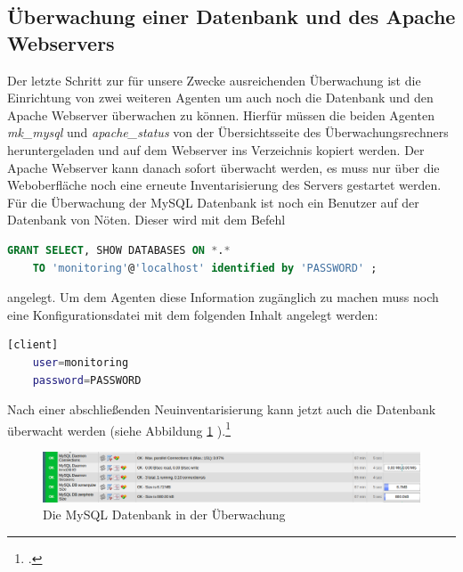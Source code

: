 \documentclass[12pt,a4paper,parskip,listof=totoc,bibliography=totoc]{scrreprt}
\begin{document}
	\subsection{Überwachung einer Datenbank und des Apache Webservers}
	Der letzte Schritt zur für unsere Zwecke ausreichenden Überwachung ist die Einrichtung von zwei weiteren Agenten um auch noch die Datenbank und den Apache Webserver überwachen zu können. Hierfür müssen die beiden Agenten \textit{mk\_mysql} und \textit{apache\_status} von der Übersichtsseite des Überwachungsrechners heruntergeladen und auf dem Webserver ins Verzeichnis  kopiert werden. Der Apache Webserver kann danach sofort überwacht werden, es muss nur über die Weboberfläche noch eine erneute Inventarisierung des Servers gestartet werden. Für die Überwachung der MySQL Datenbank ist noch ein Benutzer auf der Datenbank von Nöten. Dieser wird mit dem Befehl
	\begin{lstlisting}[language=sql, caption=Benutzer fürs Monitoring auf der Datenbank anlegen, label=lst:sqluser]
	GRANT SELECT, SHOW DATABASES ON *.*
	TO 'monitoring'@'localhost' identified by 'PASSWORD' ;\end{lstlisting}
	angelegt. Um dem Agenten diese Information zugänglich zu machen muss noch eine Konfigurationsdatei  mit dem folgenden Inhalt angelegt werden:
	\begin{lstlisting}[language=bash, caption=/etc/check\_mk/mysql.cfg, label=lst:configmkmysql]
	[client]
	user=monitoring
	password=PASSWORD\end{lstlisting}
	Nach einer abschließenden Neuinventarisierung kann jetzt auch die Datenbank überwacht werden (siehe Abbildung \ref{fig:mysqlueberw} ).\footcite{checkmkmysql}
	\begin{figure}[h!]
	\centering
	\includegraphics[width=1\linewidth]{pics/mysqlueberw}
	\caption[Die MySQL Datenbank in der Überwachung]{Die MySQL Datenbank in der Überwachung}
	\label{fig:mysqlueberw}
	\end{figure}
\end{document}
